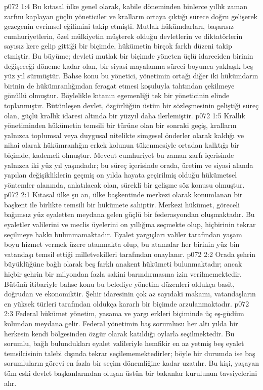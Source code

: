 \vs p072 1:4 Bu kıtasal ülke genel olarak, kabile döneminden binlerce yıllık zaman zarfını kaplayan güçlü yöneticiler ve kralların ortaya çıktığı sürece doğru gelişerek gezegenin evrimsel eğilimini takip etmişti. Mutlak hükümdarları, başarısız cumhuriyetlerin, özel mülkiyetin müşterek olduğu devletlerin ve diktatörlerin sayısız kere gelip gittiği bir biçimde, hükümetin birçok farklı düzeni takip etmiştir. Bu büyüme; devleti mutlak bir biçimde yöneten üçlü idareciden birinin değişeceği döneme kadar olan, bir siyasi mayalanma süreci boyunca yaklaşık beş yüz yıl sürmüştür. Bahse konu bu yönetici, yönetimin ortağı diğer iki hükümdarın birinin de hükümranlığından feragat etmesi koşuluyla tahtından çekilmeye gönüllü olmuştur. Böylelikle kıtanın egemenliği tek bir yöneticinin elinde toplanmıştır. Bütünleşen devlet, özgürlüğün üstün bir sözleşmesinin geliştiği süreç olan, güçlü krallık idaresi altında bir yüzyıl daha ilerlemiştir.
\vs p072 1:5 Krallık yönetiminden hükümetin temsili bir türüne olan bir sonraki geçiş, kralların yalnızca toplumsal veya duygusal nitelikte simgesel önderler olarak kaldığı ve nihai olarak hükümranlığın erkek kolunun tükenmesiyle ortadan kalktığı bir biçimde, kademeli olmuştur. Mevcut cumhuriyet bu zaman zarfı içerisinde yalnızca iki yüz yıl yaşındadır; bu süreç içerisinde orada, üretim ve siyasi alanda yapılan değişikliklerin geçmiş on yılda hayata geçirilmiş olduğu hükümetsel yöntemler alanında, anlatılacak olan, sürekli bir gelişme söz konusu olmuştur.
\vs p072 2:1 Kıtasal ülke şu an, ülke başkentinde merkezi olarak konumlanan bir başkent ile birlikte temsili bir hükümete sahiptir. Merkezi hükümet, göreceli bağımsız yüz eyaletten meydana gelen güçlü bir federasyondan oluşmaktadır. Bu eyaletler valilerini ve meclis üyelerini on yıllığına seçmekte olup, hiçbirinin tekrar seçilmeye hakkı bulunmamaktadır. Eyalet yargıçları valiler tarafından yaşam boyu hizmet vermek üzere atanmakta olup, bu atamalar her birinin yüz bin vatandaşı temsil ettiği milletvekilleri tarafından onaylanır.
\vs p072 2:2 Orada şehrin büyüklüğüne bağlı olarak beş farklı anakent hükümeti bulunmaktadır; ancak hiçbir şehrin bir milyondan fazla sakini barındırmasına izin verilmemektedir. Bütünü itibariyle bahse konu bu belediye yönetim düzenleri oldukça basit, doğrudan ve ekonomiktir. Şehir idaresinin çok az sayıdaki makamı, vatandaşların en yüksek türleri tarafından oldukça kararlı bir biçimde arzulanmaktadır.
\vs p072 2:3 Federal hükümet yönetim, yasama ve yargı erkleri biçiminde üç eş\hyp{}güdüm kolundan meydana gelir. Federal yönetimin baş sorumlusu her altı yılda bir herkesin kendi bölgesinden özgür olarak katıldığı oylarla seçilmektedir. Bu sorumlu, bağlı bulundukları eyalet valileriyle hemfikir en az yetmiş beş eyalet temsilcisinin talebi dışında tekrar seçilememektedirler; böyle bir durumda ise baş sorumluların görevi en fazla bir seçim dönemliğine kadar uzatılır. Bu kişi, yaşayan tüm eski devlet başkanlarından oluşan üstün bir bakanlar kurulunun tavsiyelerini alır.

